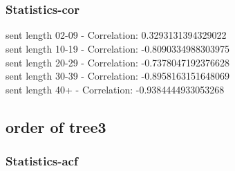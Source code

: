 \documentclass{article}%
\begin{document}
\begin{figure}[ht]%
\centering%
\setlength{\abovecaptionskip}{-35pt}%
%
%
\\%
%
%
\\%
%
\end{figure}

%
\newpage%
\subsubsection{Statistics{-}cor}%
\label{ssubsec:Statistics{-}cor}%
\noindent%
sent length 02-09 - Correlation: 0.3293131394329022\\%
sent length 10-19 - Correlation: -0.8090334988303975\\%
sent length 20-29 - Correlation: -0.7378047192376628\\%
sent length 30-39 - Correlation: -0.8958163151648069\\%
sent length 40+ - Correlation: -0.9384444933053268\\

%
\newpage

%
\subsection{order of tree3}%
\label{subsec:orderoftree3}%
\subsubsection{Statistics{-}acf}%
\label{ssubsec:Statistics{-}acf}%
\end{document}
